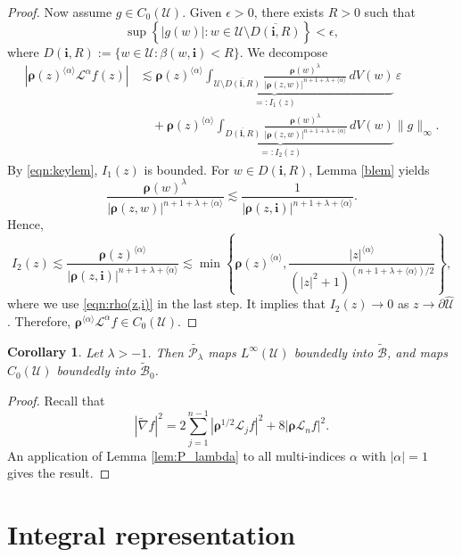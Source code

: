 \documentclass{amsart}
\newtheorem{corollary}[theorem]{Corollary}
\numberwithin{equation}{section}
\newcommand{\bfL}{\mathcal{L}}
\newcommand{\calU}{\mathcal{U}}
\newcommand{\bfi}{\mathbf{i}}
\newcommand{\bfrho}{\boldsymbol{\rho}}
\newcommand{\calB}{\mathcal{B}}
\begin{document}
\begin{proof}
Now assume $g\in C_0(\calU)$.
Given $\epsilon>0$, there exists $R>0$ such that
\[
\sup \left\{ |g(w)|: w\in \calU\setminus \overline{D(\bfi, R)} \right\} < \epsilon,
\]
where $D(\bfi, R):=\{w\in \calU: \beta(w,\bfi)< R\}$.
We decompose
\begin{align*}
|\bfrho(z)^{\langle\alpha\rangle}\bfL^\alpha f(z)|
&\lesssim
\underbrace{
\bfrho(z)^{\langle\alpha\rangle}
\int_{\calU\setminus\overline{D(\bfi,R)}}
\frac{\bfrho(w)^\lambda}
     {|\bfrho(z,w)|^{n+1+\lambda+\langle\alpha\rangle}}
\, dV(w)}_{=:I_1(z)}\,\varepsilon\\
&\quad+
\underbrace{
\bfrho(z)^{\langle\alpha\rangle}
\int_{\overline{D(\bfi,R)}}
\frac{\bfrho(w)^\lambda}
     {|\bfrho(z,w)|^{n+1+\lambda+\langle\alpha\rangle}}
\, dV(w)}_{=:I_2(z)}
\|g\|_\infty .
\end{align*}
By \eqref{eqn:keylem}, $I_1(z)$ is bounded.
For $w\in D(\bfi,R)$, Lemma \ref{blem} yields
\[
\frac{ \bfrho(w)^{\lambda}}{|\bfrho(z,w)|^{n+1+\lambda+\langle \alpha \rangle}}
\lesssim \frac{1} {|\bfrho(z,\bfi)|^{n+1+\lambda+\langle \alpha \rangle}}.
\]
Hence,
\[
I_2(z) \lesssim \frac{\bfrho(z)^{\langle \alpha \rangle} } {|\bfrho(z,\bfi)|^{n+1+\lambda+\langle \alpha \rangle}}
\lesssim \min\left\{\bfrho(z)^{\langle \alpha \rangle},\frac{{|z|}^{\langle \alpha \rangle}}{(|z|^2+1)^{(n+1+\lambda+\langle \alpha \rangle)/2}}\right\},
\]
where we use \eqref{eqn:rho(z,i)} in the last step.
It implies that $I_2(z)\to 0$ as $z\to\partial\widehat{\calU}$.
Therefore, $\bfrho^{\langle \alpha \rangle} \bfL^{\alpha} f \in C_0(\calU)$.
\end{proof}

\begin{corollary}\label{cor:P_lambdainto}
Let $\lambda>-1$.  Then $\widetilde{\mathcal{P}_\lambda}$ maps $L^\infty(\calU)$ boundedly into $\widetilde{\calB}$,
and maps $C_0(\calU)$ boundedly into $\widetilde{\calB}_0$.
\end{corollary}
\begin{proof}
Recall that 
\[
|\widetilde{\nabla}f|^2=2\sum_{j=1}^{n-1}|\bfrho^{1/2}\bfL_j f|^2+8|\bfrho\bfL_n f|^2.
\]
An application of Lemma \ref{lem:P_lambda} to all multi-indices $\alpha$ with $|\alpha|=1$ gives the result.
\end{proof}





\section{Integral representation}
\end{document}
